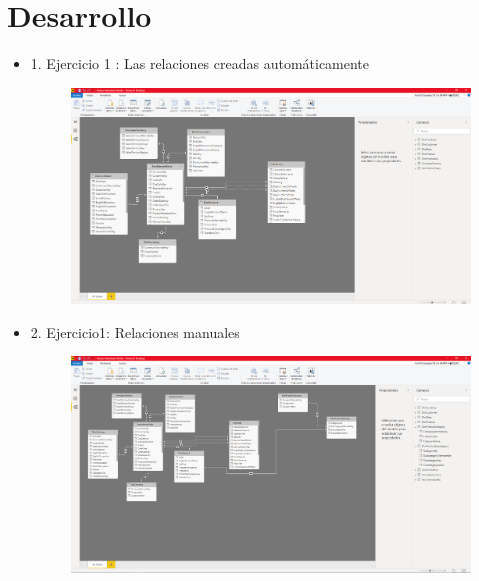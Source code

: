 \section{Desarrollo} 
\begin{itemize}

	\item 1. Ejercicio 1 : Las relaciones creadas automáticamente
		\begin{figure}[H]
		\begin{center}
		\includegraphics[width=18cm]{./Imagenes/imagen1}
		\end{center}
		\end{figure}

     	\item2. Ejercicio1: Relaciones manuales  
		\begin{figure}[H]
		\begin{center}
		\includegraphics[width=18cm]{./Imagenes/imagen2}
		\end{center}
		\end{figure}
     

\end{itemize}

